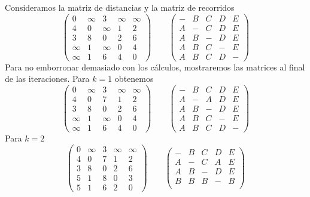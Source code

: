 \documentclass[twoside]{article}
\begin{document}
\begin{solucion}
Consideramos la matriz de distancias y la matriz de recorridos
$$
\begin{pmatrix}
0		& \infty 	& 3 		& \infty 	& \infty\\
4 		& 0			& \infty	& 1			& 2\\
3		& 8			& 0			& 2			& 6\\
\infty	& 1			& \infty	& 0			& 4\\
\infty	& 1			& 6			& 4			& 0
\end{pmatrix}
\qquad
\begin{pmatrix}
-	& B 	& C 	& D 	& E\\
A	& -		& C		& D		& E\\
A	& B		& -		& D		& E\\
A	& B		& C		& -		& E\\
A	& B		& C		& D		& -
\end{pmatrix}
$$
Para no emborronar demasiado con los cálculos, mostraremos las matrices al final de las iteraciones. Para $k=1$ obtenemos
$$
\begin{pmatrix}
0		& \infty 	& 3 		& \infty 	& \infty\\
4 		& 0			& 7			& 1			& 2\\
3		& 8			& 0			& 2			& 6\\
\infty	& 1			& \infty	& 0			& 4\\
\infty	& 1			& 6			& 4			& 0
\end{pmatrix}
\qquad
\begin{pmatrix}
-	& B 	& C 	& D 	& E\\
A	& -		& A		& D		& E\\
A	& B		& -		& D		& E\\
A	& B		& C		& -		& E\\
A	& B		& C		& D		& -
\end{pmatrix}
$$
Para $k=2$
$$
\begin{pmatrix}
0		& \infty 	& 3 		& \infty 	& \infty\\
4 		& 0			& 7			& 1			& 2\\
3		& 8			& 0			& 2			& 6\\
5		& 1			& 8			& 0			& 3\\
5		& 1			& 6			& 2			& 0
\end{pmatrix}
\qquad
\begin{pmatrix}
-	& B 	& C 	& D 	& E\\
A	& -		& C		& A		& E\\
A	& B		& -		& D		& E\\
B	& B		& B		& -		& B\\

\end{pmatrix}$$
\end{solucion}
\end{document}
